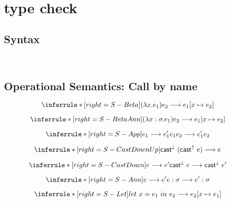 \section{type check}

\subsection{Syntax}
\gram{
      \otte\ottinterrule
      \ottR\ottinterrule
      \ottt\ottinterrule
  }
\\[2.0mm]


\newcommand{\tpmapsto}[3]{#2\mapsto#3}



\subsection{Operational Semantics: Call by name}

\newcommand{\castupe}{\ensuremath{\mathsf{cast}^{\uparrow}\ }}
\newcommand{\castdowne}{\ensuremath{\mathsf{cast}^{\downarrow}\ }}

\[
\inferrule*[right=S-Beta]
{  }
{ (\lambda x. e_1) e_2 \longrightarrow e_1 [x\mapsto e_2] }
\]

\[
\inferrule*[right=S-BetaAnn]
{  }
{ (\lambda x:\sigma. e_1) e_2 \longrightarrow e_1 [x\mapsto e_2] }
\]

\[
\inferrule*[right=S-App]
{ e_1 \longrightarrow e_1'  }
{ e_1 e_2 \longrightarrow e_1' e_2}
\]

\[
\inferrule*[right=S-CastDownUp]
{  }
{ \castdowne (\castupe e)  \longrightarrow e }
\]

\[
\inferrule*[right=S-CastDown]
{ e \longrightarrow e' }
{ \castdowne  e  \longrightarrow  \castdowne  e' }
\]

\[
\inferrule*[right=S-Ann]
{ e \longrightarrow e'  }
{ e:\sigma \longrightarrow e':\sigma}
\]

\[
\inferrule*[right=S-Let]
{  }
{ let\ x = e_1\ in\ e_2 \longrightarrow e_2[x\mapsto e_1] }
\]


